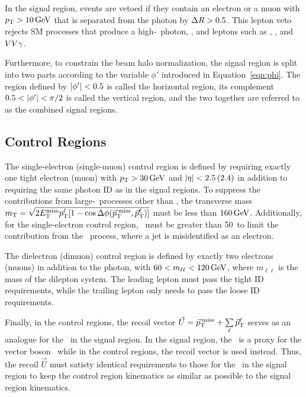 In the signal region, events are vetoed if they contain an electron or a muon with $p_{\mathrm{T}} > 10\,\text{Ge\hspace{-.08em}V}$ that is separated from the photon by $\Delta R > 0.5$. This lepton veto rejects SM processes that produce a high-\pt\ photon, \met, and leptons such as \wlng, \ttg, and $VV\gamma$. %

Furthermore, to constrain the beam halo normalization, the signal region is split into two parts according to the variable $\phi'$ introduced in Equation~\ref{eqn:phi}. 
The region defined by $\lvert \phi' \rvert < 0.5$ is called the horizontal region, its complement $0.5 < \lvert \phi' \rvert < \pi/2$ is called the vertical region, and the two together are referred to as the combined signal regions.

\subsection{Control Regions}
\label{sec:control_regions}

The single-electron (single-muon) control region is defined by requiring exactly one tight electron (muon) with $p_{\mathrm{T}} > 30\,\text{Ge\hspace{-.08em}V}$ and $\lvert \eta \rvert < 2.5\,(2.4)$ in addition to requiring the same photon ID as in the signal regions.
To suppress the contributions from large-\met\ processes other than \wlng, the transverse mass $m_{\mathrm{T}} = \sqrt{\smash[b]{2E_{\mathrm{T}}^{\text{miss}}p_{\mathrm{T}}^{\ell}[1-\cos\Delta\phi({\vec p}_{\mathrm{T}}^{\kern2pt\text{miss}},{\vec p}_{\mathrm{T}}^{\ell})]}}$ must be less than $160\,\text{Ge\hspace{-.08em}V}$.
Additionally, for the single-electron control region, \met\ must be greater than 50\GeV\ to limit the contribution from the \gj\ process, where a jet is misidentified as an electron. %

The dielectron (dimuon) control region is defined by exactly two electrons (muons) in addition to the photon, with $60 < m_{\ell\ell} < 120\,\text{Ge\hspace{-.08em}V}$, where $m_{\ell\ell}$ is the mass of the dilepton system.
The leading lepton must pass the tight ID requirements, while the trailing lepton only needs to pass the loose ID requirements. 

Finally, in the control regions, the recoil vector $\vec{U} = {\vec p}_{\mathrm{T}}^{\kern2pt\text{miss}} + \sum\limits_\ell{\vec p}_{\mathrm{T}}^{\ell}$ serves as an analogue for the \ptvecmiss\ in the signal region.
In the signal region, the \ptvecmiss\ is a proxy for the vector boson \pt\ while in the control regions, the recoil vector is used instead. 
Thus, the recoil $\vec{U}$ must satisty identical requirements to those for the \ptvecmiss\ in the signal region to keep the control region kinematics as similar as possible to the signal region kinematics.

